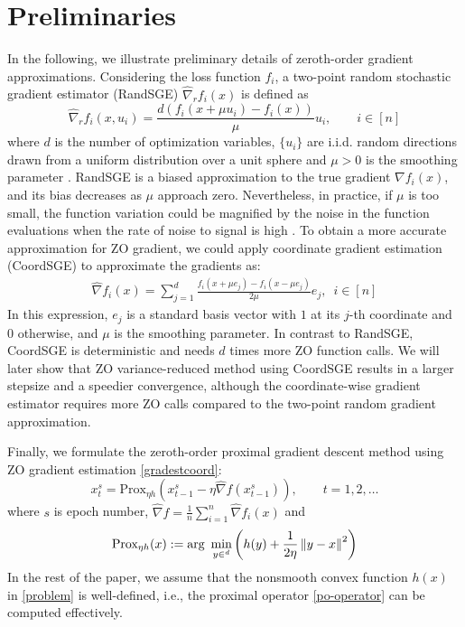 \documentclass[iicol,sn-basic]{sn-jnl}
\theoremstyle{thmstyleone}%
\theoremstyle{thmstyletwo}%
\theoremstyle{thmstylethree}%
\let\R\relax
\newcommand*{\R}{\mathbb{R}}
\newcommand*{\Po}{\text{Prox}}
\newcommand{\norm}[1]{\left\lVert#1\right\rVert}
\begin{document}
\section{Preliminaries}
In the following, we illustrate preliminary details of zeroth-order gradient approximations. Considering the loss function $f_i$, a two-point random stochastic gradient estimator (RandSGE) $\hat{\nabla}_r f_i(x)$ is defined as \cite{nesterov2017random,gao2018information}
\begin{equation}\label{gradestrand}
\hat{\nabla}_r f_i(x, u_i) = \frac{d(f_i(x+\mu u_i) - f_i(x))}{\mu}u_i,\qquad i\in [n]
\end{equation}
where $d$ is the number of optimization variables, $\{u_i\}$ are i.i.d. random directions drawn from a uniform distribution over a unit sphere and $\mu > 0$ is the smoothing parameter  \cite{flaxman2005online,shamir2017optimal,gao2018information}. RandSGE is a biased approximation to the true gradient $\nabla f_i(x)$, and its bias decreases as $\mu$ approach zero. Nevertheless, in practice, if $\mu$ is too small, the function variation
could be magnified by the noise in the function evaluations when the rate of noise to signal is high  
 \cite{lian2016comprehensive}.
To obtain a more accurate approximation for ZO gradient, we could apply coordinate gradient estimation (CoordSGE) \cite{gu2018inexact,gu2018faster,liu2018zeroth} to approximate the gradients as:
\begin{align}\label{gradestcoord}
\hat{\nabla} f_i(x) = \sum_{j=1}^d \frac{f_i(x+\mu e_j) - f_i(x-\mu e_j)}{2\mu}e_j,\,\,\,i\in [n]
\end{align}
In this expression, $e_j$ is a standard basis vector with $1$ at its $j$-th coordinate and $0$ otherwise, and $\mu$ is the smoothing parameter. In contrast to RandSGE, CoordSGE is deterministic and needs $d$ times more ZO function calls. 
We will later show that ZO variance-reduced method using CoordSGE results in a
larger stepsize and a speedier convergence, although the coordinate-wise gradient estimator requires more ZO calls compared to the two-point random gradient approximation. 

Finally, we formulate the zeroth-order proximal gradient descent method using ZO gradient estimation \eqref{gradestcoord}:
\begin{equation}
x_{t}^s= \Po_{\eta h}(x_{t-1}^s - \eta \hat{\nabla} f(x_{t-1}^s)),\qquad t=1, 2, \ldots
\end{equation}
where $s$ is epoch number, $\hat{\nabla} f=\frac{1}{n}\sum_{i=1}^n \hat{\nabla} f_i(x)$ and 
\begin{equation}\label{po-operator}
\Po_{\eta h}(x) := \text{arg}\,\,\min_{y\in\R^d}\left(h(y)+\frac{1}{2\eta}\norm{y-x}^2\right)
\end{equation}
In the rest of the paper, we assume that the
nonsmooth convex function $h(x)$ in \eqref{problem} is well-defined, i.e., the proximal operator \eqref{po-operator} can be computed effectively.
\end{document}
